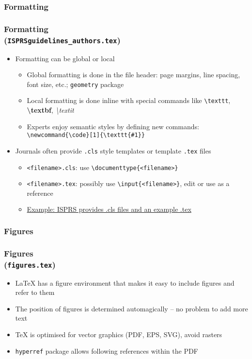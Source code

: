 \documentclass[xetex,colorlinks]{beamer} %
\begin{document}
  \subsubsection{Formatting}
  \begin{frame}
    \frametitle{Formatting \\ (\texttt{ISPRSguidelines\_authors.tex})}
    \begin{itemize}
     \item Formatting can be global or local
     \begin{itemize}
      \item Global formatting is done in the file header: page margins, line spacing, font size, etc.; \texttt{geometry} package
      \item Local formatting is done inline with special commands like \texttt{\textbackslash{}texttt}, \textbf{\textbackslash{}textbf}, \textit{\textbackslash{}textit}
      \item Experts enjoy semantic styles by defining new commands: \texttt{\textbackslash{}newcommand\{\textbackslash{}code\}[1]\{\textbackslash{}texttt\{\#1\}\}}
     \end{itemize}
     \item Journals often provide \texttt{.cls} style templates or template \texttt{.tex} files
     \begin{itemize}
      \item \texttt{<filename>.cls}: use \texttt{\textbackslash{}documenttype\{<filename>\}}
      \item \texttt{<filename>.tex}: possibly use \texttt{\textbackslash{}input\{<filename>\}}, edit or use as a reference
      \item \href{http://www.isprs.org/documents/orangebook/app5.aspx}{Example: ISPRS provides .cls files and an example .tex}
     \end{itemize}
    \end{itemize}
  \end{frame}
  
  \subsubsection{Figures}
  \begin{frame}
    \frametitle{Figures \\ (\texttt{figures.tex})}
    \begin{itemize}
     \item \LaTeX{} has a figure environment that makes it easy to include figures and refer to them
     \item The position of figures is determined automagically – no problem to add more text
     \item \TeX{} is optimised for vector graphics (PDF, EPS, SVG), avoid rasters
     \item \texttt{hyperref} package allows following references within the PDF
    \end{itemize}
  \end{frame}
  
\end{document}
